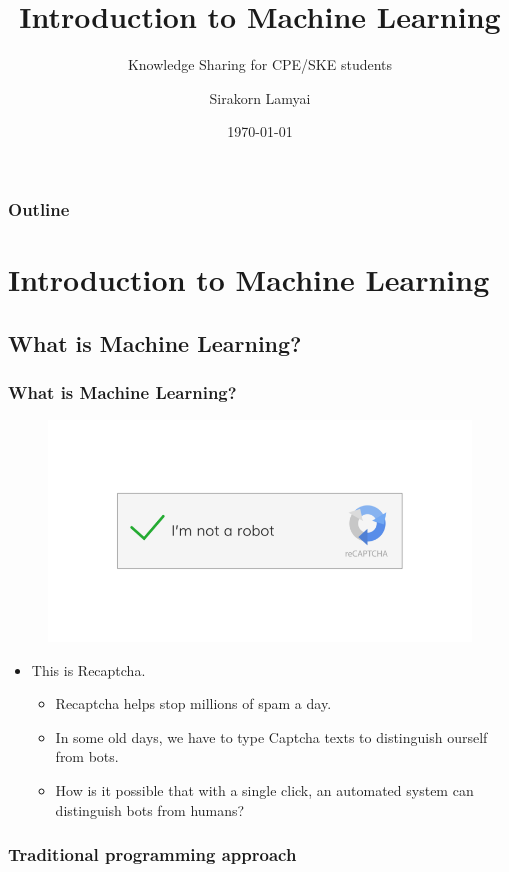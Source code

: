 \documentclass[]{beamer}
\title{Introduction to Machine Learning}
\subtitle{Knowledge Sharing for CPE/SKE students}
\author{Sirakorn Lamyai}
\institute{Student, Kasetsart U.}
\date{\today}
\begin{document}
\begin{frame}
\titlepage
\end{frame}

\begin{frame}
\frametitle{Outline}
\tableofcontents
\end{frame}

\section{Introduction to Machine Learning}

\subsection{What is Machine Learning?}

\begin{frame}
\frametitle{What is Machine Learning?}
\pause
\begin{figure}
\includegraphics[scale=1]{imgs/recaptcha.png}
\end{figure}
\begin{itemize}
\pause
\item This is Recaptcha.
\begin{itemize}
\pause
\item Recaptcha helps stop millions of spam a day.
\pause
\item In some old days, we have to type Captcha texts to distinguish ourself from bots.
\pause
\item How is it possible that with a single click, an automated system can distinguish bots from humans?
\end{itemize}
\end{itemize}
\end{frame}

\subsubsection{Traditional programming approach}
\end{document}
